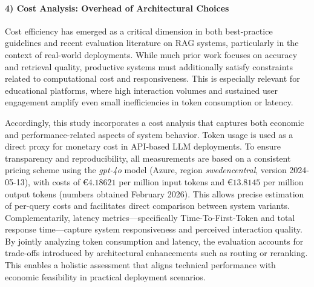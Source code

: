 \paragraph{4) Cost Analysis: Overhead of Architectural Choices}
Cost efficiency has emerged as a critical dimension in both best-practice guidelines and recent evaluation literature on RAG systems, particularly in the context of real-world deployments. While much prior work focuses on accuracy and retrieval quality, productive systems must additionally satisfy constraints related to computational cost and responsiveness. This is especially relevant for educational platforms, where high interaction volumes and sustained user engagement amplify even small inefficiencies in token consumption or latency.

Accordingly, this study incorporates a cost analysis that captures both economic and performance-related aspects of system behavior. Token usage is used as a direct proxy for monetary cost in API-based LLM deployments. To ensure transparency and reproducibility, all measurements are based on a consistent pricing scheme using the \textit{gpt-4o} model (Azure, region \textit{swedencentral}, version 2024-05-13), with costs of $€4.18621$ per million input tokens and $€13.8145$ per million output tokens (numbers obtained February 2026). This allows precise estimation of per-query costs and facilitates direct comparison between system variants. Complementarily, latency metrics—specifically Time-To-First-Token and total response time—capture system responsiveness and perceived interaction quality. By jointly analyzing token consumption and latency, the evaluation accounts for trade-offs introduced by architectural enhancements such as routing or reranking. This enables a holistic assessment that aligns technical performance with economic feasibility in practical deployment scenarios.